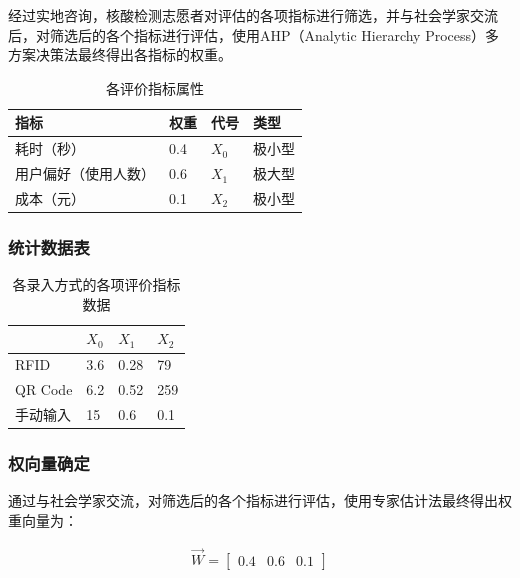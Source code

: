 \documentclass[
  journal=,
  manuscript=,
  year=2022,
  volume=01,
]{cup-journal}
\begin{document}
\par 经过实地咨询，核酸检测志愿者对评估的各项指标进行筛选，并与社会学家交流后，对筛选后的各个指标进行评估，使用AHP（Analytic Hierarchy Process）多方案决策法最终得出各指标的权重。

\begin{table}[hbt!]
	\begin{threeparttable}
	\caption{各评价指标属性}
	\label{table_3}
	\begin{tabular}{llll}
	\toprule
	\headrow 指标 & 权重 & 代号 & 类型 \\
	\midrule
	耗时（秒） & 0.4 & $X_{0}$ & 极小型 \\
	\midrule
	用户偏好（使用人数） & 0.6 & $X_{1}$ & 极大型 \\
	\midrule
	成本（元） & 0.1 & $X_{2}$ & 极小型 \\
	\bottomrule
	\end{tabular}
	\end{threeparttable}
\end{table}

\subsubsection{统计数据表}

\begin{table}[hbt!]
	\begin{threeparttable}
	\caption{各录入方式的各项评价指标数据}
	\label{table_4}
	\begin{tabular}{llll}
	\toprule
	\headrow  & $X_{0}$ & $X_{1}$ & $X_{2}$ \\
	\midrule
	RFID & 3.6 & 0.28 & 79 \\
	\midrule
	QR Code & 6.2 & 0.52 & 259 \\
	\midrule
	手动输入 & 15 & 0.6 & 0.1 \\
	\bottomrule
	\end{tabular}
	\end{threeparttable}
\end{table}


\subsubsection{权向量确定}

\par 通过与社会学家交流，对筛选后的各个指标进行评估，使用专家估计法最终得出权重向量为：

\begin{equation}
	\begin{aligned}
		\overrightarrow{W}=
		\begin{bmatrix}
			0.4 & 0.6 & 0.1
		\end{bmatrix}
	\end{aligned}
\end{equation}
\end{document}
